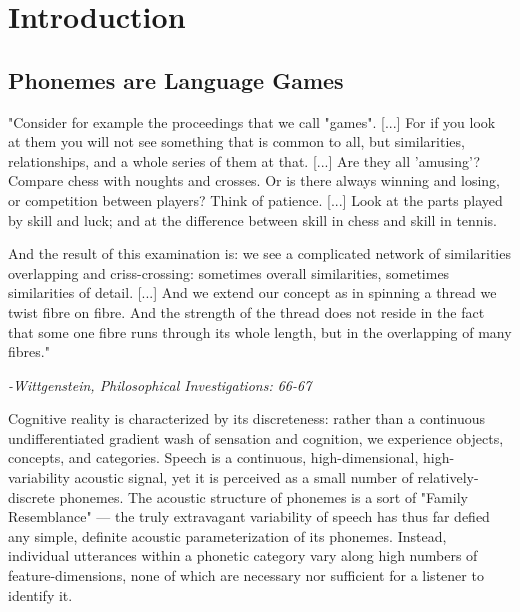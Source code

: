 
% 

\section{Introduction}
\begin{multicols}{2}

\subsection{Phonemes are Language Games}

\begin{leftbar}

"Consider for example the proceedings that we call "games". [...] For if you look at them you will not see something that is common to all, but similarities, relationships, and a whole series of them at that. [...] Are they all 'amusing'? Compare chess with noughts and crosses. Or is there always winning and losing, or competition between players? Think of patience. [...] Look at the parts played by skill and luck; and at the difference between skill in chess and skill in tennis. 

And the result of this examination is: we see a complicated network
of similarities overlapping and criss-crossing: sometimes overall similarities, sometimes similarities of detail. [...] And we extend our concept as in spinning a thread we twist fibre on fibre. And the strength of the thread does not reside in the fact that some one fibre runs through its whole length, but in the overlapping of many fibres."

\textit{-Wittgenstein, Philosophical Investigations: 66-67\cite{wittgensteinPhilosophicalInvestigations1968}}

\end{leftbar}

Cognitive reality is characterized by its discreteness: rather than a continuous undifferentiated gradient wash of sensation and cognition, we experience objects, concepts, and categories. Speech is a continuous, high-dimensional, high-variability acoustic signal, yet it is perceived as a small number of relatively-discrete phonemes\cite{holtSpeechPerceptionCategorization2010a}. The acoustic structure of phonemes is a sort of "Family Resemblance"\cite{wittgensteinPhilosophicalInvestigations1968} --- the truly extravagant variability of speech has thus far defied any simple, definite acoustic parameterization of its phonemes. Instead, individual utterances within a phonetic category vary along high numbers of feature-dimensions, none of which are necessary nor sufficient for a listener to identify it\cite{Lisker1977,Bailey1980}.


\end{multicols}
